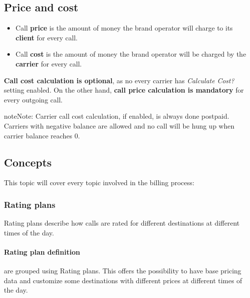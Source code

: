 \documentclass[letterpaper,10pt,english]{sphinxmanual}
\begin{document}
\subsection{Price and cost}
\label{administration_portal/brand/billing/index:price-and-cost}\begin{itemize}
\item {} 
Call \textbf{price} is the amount of money the brand operator will charge to its \textbf{client} for every call.

\item {} 
Call \textbf{cost} is the amount of money the brand operator will be charged by the \textbf{carrier} for every call.

\end{itemize}

\textbf{Call cost calculation is optional}, as no every carrier has \emph{Calculate Cost?} setting enabled. On the other hand, \textbf{call
price calculation is mandatory} for every outgoing call.

\begin{notice}{note}{Note:}
Carrier call cost calculation, if enabled, is always done postpaid. Carriers with negative balance are allowed and
no call will be hung up when carrier balance reaches 0.
\end{notice}


\subsection{Concepts}
\label{administration_portal/brand/billing/index:concepts}
This topic will cover every topic involved in the billing process:


\subsubsection{Rating plans}
\label{administration_portal/brand/billing/rating_plans:rating-plans}\label{administration_portal/brand/billing/rating_plans::doc}\label{administration_portal/brand/billing/rating_plans:id1}
Rating plans describe how calls are rated for different destinations at different times of the day.


\paragraph{Rating plan definition}
\label{administration_portal/brand/billing/rating_plans:rating-plan-definition}
{\hyperref[administration_portal/brand/billing/destination_rates:destination\string-rates]{}} are grouped using Rating plans. This offers the possibility to have base pricing data and customize
some destinations with different prices at different times of the day.
\end{document}
